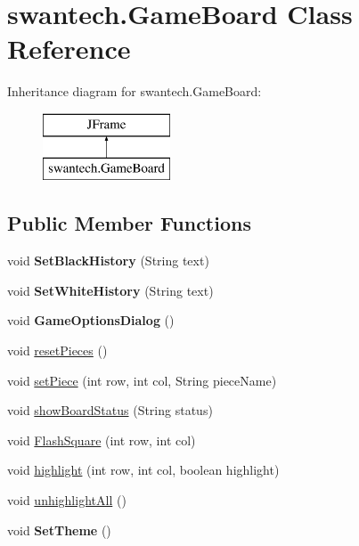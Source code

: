 \hypertarget{classswantech_1_1_game_board}{}\section{swantech.\+Game\+Board Class Reference}
\label{classswantech_1_1_game_board}
Inheritance diagram for swantech.\+Game\+Board\+:\begin{figure}[H]
\begin{center}
\leavevmode
\includegraphics[height=2.000000cm]{classswantech_1_1_game_board}
\end{center}
\end{figure}
\subsection*{Public Member Functions}
\begin{DoxyCompactItemize}
\item 
\hypertarget{classswantech_1_1_game_board_a96ebddb815846afa4c27770196677e93}{}void {\bfseries Set\+Black\+History} (String text)\label{classswantech_1_1_game_board_a96ebddb815846afa4c27770196677e93}

\item 
\hypertarget{classswantech_1_1_game_board_ad3af6eb08224d1765b3d7d350b35235e}{}void {\bfseries Set\+White\+History} (String text)\label{classswantech_1_1_game_board_ad3af6eb08224d1765b3d7d350b35235e}

\item 
\hypertarget{classswantech_1_1_game_board_a0c035906eeeb258acfaa8b5d55d0ca0f}{}void {\bfseries Game\+Options\+Dialog} ()\label{classswantech_1_1_game_board_a0c035906eeeb258acfaa8b5d55d0ca0f}

\item 
void \hyperlink{classswantech_1_1_game_board_a8b593a2b2e1f7ace526aaeceaef99724}{reset\+Pieces} ()
\item 
void \hyperlink{classswantech_1_1_game_board_add61d2ac401b20f5f847ca0e96c9caa5}{set\+Piece} (int row, int col, String piece\+Name)
\item 
void \hyperlink{classswantech_1_1_game_board_aa19d65d287fdbcc49088dfe04b1d02d8}{show\+Board\+Status} (String status)
\item 
void \hyperlink{classswantech_1_1_game_board_a37481f0e2444ee2e092edc3e714382bc}{Flash\+Square} (int row, int col)
\item 
void \hyperlink{classswantech_1_1_game_board_a77b64cccf5aaa809b608c4a8de53ccd9}{highlight} (int row, int col, boolean highlight)
\item 
void \hyperlink{classswantech_1_1_game_board_aaa24ba8f39f0246860a47641f71a6ddf}{unhighlight\+All} ()
\item 
\hypertarget{classswantech_1_1_game_board_a0a4e857cfd4b2a7a1b9ac6fa9073a968}{}void {\bfseries Set\+Theme} ()\label{classswantech_1_1_game_board_a0a4e857cfd4b2a7a1b9ac6fa9073a968}

\end{DoxyCompactItemize}
